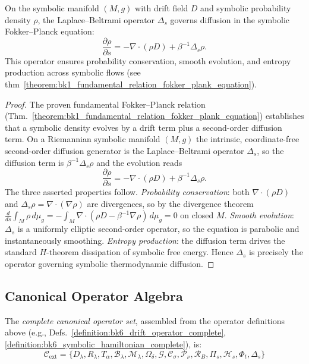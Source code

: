 \begin{theorem}
\label{theorem:bk6_symbolic_diffusion_governs_evolution}
On the symbolic manifold $(M, g)$ with drift field $D$ and symbolic probability density $\rho$, the Laplace–Beltrami operator $\Delta_s$ governs diffusion in the symbolic Fokker–Planck equation:
\[
\frac{\partial \rho}{\partial s} = -\nabla \cdot (\rho D) + \beta^{-1} \Delta_s \rho.
\]
This operator ensures probability conservation, smooth evolution, and entropy production across symbolic flows (see thm~\ref{theorem:bk1_fundamental_relation_fokker_plank_equation}).
\end{theorem}
\begin{proof}
\label{proof:bk6_symbolic_diffusion_governs_evolution}
\leavevmode
The proven fundamental Fokker--Planck relation (Thm.~\ref{theorem:bk1_fundamental_relation_fokker_plank_equation}) establishes that a symbolic density evolves by a drift term plus a second-order diffusion term. On a Riemannian symbolic manifold $(M,g)$ the intrinsic, coordinate-free second-order diffusion generator is the Laplace--Beltrami operator $\Delta_s$, so the diffusion term is $\beta^{-1}\Delta_s\rho$ and the evolution reads
\[
\frac{\partial\rho}{\partial s}=-\nabla\cdot(\rho D)+\beta^{-1}\Delta_s\rho .
\]
The three asserted properties follow. \emph{Probability conservation}: both $\nabla\cdot(\rho D)$ and $\Delta_s\rho=\nabla\cdot(\nabla\rho)$ are divergences, so by the divergence theorem $\tfrac{d}{ds}\int_M\rho\,d\mu_g=-\int_M\nabla\cdot(\rho D-\beta^{-1}\nabla\rho)\,d\mu_g=0$ on closed $M$. \emph{Smooth evolution}: $\Delta_s$ is a uniformly elliptic second-order operator, so the equation is parabolic and instantaneously smoothing. \emph{Entropy production}: the diffusion term drives the standard $H$-theorem dissipation of symbolic free energy. Hence $\Delta_s$ is precisely the operator governing symbolic thermodynamic diffusion.
\end{proof}

\subsection{Canonical Operator Algebra}
\label{subsec:bk6_canonical_operator_algebra}

\begin{definition}
\label{definition:bk6_complete_canonical_set}
The \emph{complete canonical operator set}, assembled from the operator definitions above (e.g., Defs.~\ref{definition:bk6_drift_operator_complete}, \ref{definition:bk6_symbolic_hamiltonian_complete}), is:
\begin{equation}
\mathcal{C}_{\text{ext}} = \{D_\lambda, R_\lambda, T_\alpha, \mathcal{B}_\lambda, \mathcal{M}_\lambda, \Omega_\delta, \mathcal{G}, \mathcal{C}_\sigma, \mathcal{P}_\nu, \mathcal{R}_B, \Pi_s, \mathcal{H}_s, \Phi_t, \Delta_s\}
\end{equation}
\end{definition}

